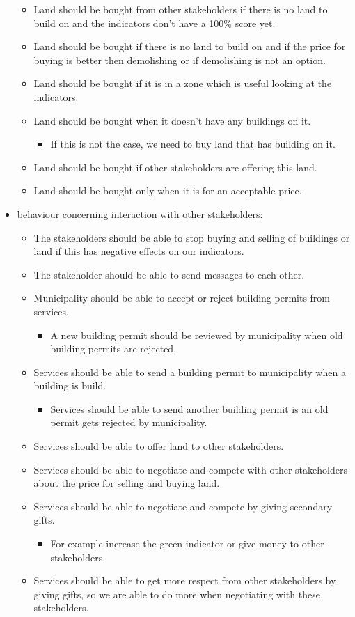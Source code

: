 \begin{itemize}
\begin{itemize}
		\item 	Land should be bought from other stakeholders if there is no land to build on and the indicators don't have a 100$\%$ score yet.
		\item	Land should be bought if there is no land to build on and if the price for buying is better then demolishing or if demolishing is not an option.
		\item	Land should be bought if it is in a zone which is useful looking at the indicators.
		\item	Land should be bought when it doesn't have any buildings on it.
		\begin{itemize}
			\item If this is not the case, we need to buy land that has  building on it.
		\end{itemize}		
		\item	Land should be bought if other stakeholders are offering this land.
		\item	Land should be bought only when it is for an acceptable price.
	\end{itemize}
	\item behaviour concerning interaction with other stakeholders:
	\begin{itemize}
		\item 	The stakeholders should be able to stop buying and selling of buildings or land if this has negative effects on our indicators.
		\item 	The stakeholder should be able to send messages to each other.
		\item 	Municipality should be able to accept or reject building permits from services.
		\begin{itemize}
			\item A new building permit should be reviewed by municipality when old building permits are rejected.
		\end{itemize}
	\item	Services should be able to send a building permit to municipality when a building is build.
	\begin{itemize}
		\item Services should be able to send another building permit is an old permit gets rejected by municipality.
	\end{itemize}	
	\item	Services should be able to offer land to other stakeholders.
	\item	Services should be able to negotiate and compete with other stakeholders about the price for selling and buying land.
	\item 	Services should be able to negotiate and compete by giving secondary gifts.
	\begin{itemize}
		\item For example increase the green indicator or give money to other stakeholders.
	\end{itemize}	
	\item	Services should be able to get more respect from other stakeholders by giving gifts, so we are able to do more when negotiating with these stakeholders.
	\end{itemize}

\end{itemize}

